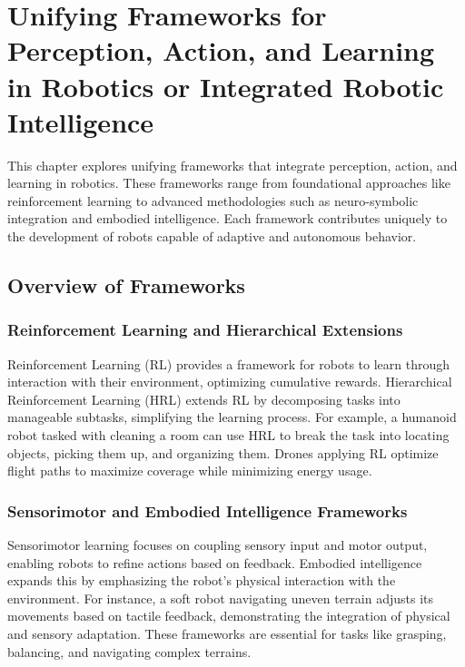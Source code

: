 \chapter{Unifying Frameworks for Perception, Action, and Learning in Robotics or Integrated Robotic Intelligence}
This chapter explores unifying frameworks that integrate perception, action, and learning in robotics. These frameworks range from foundational approaches like reinforcement learning to advanced methodologies such as neuro-symbolic integration and embodied intelligence. Each framework contributes uniquely to the development of robots capable of adaptive and autonomous behavior.

\section{Overview of Frameworks}
    \subsection{Reinforcement Learning and Hierarchical Extensions}
    Reinforcement Learning (RL) provides a framework for robots to learn through interaction with their environment, optimizing cumulative rewards. Hierarchical Reinforcement Learning (HRL) extends RL by decomposing tasks into manageable subtasks, simplifying the learning process. For example, a humanoid robot tasked with cleaning a room can use HRL to break the task into locating objects, picking them up, and organizing them. Drones applying RL optimize flight paths to maximize coverage while minimizing energy usage. \cite{sutton-2018-reinforcement-learning} \cite{barto-2003-hierarchical}
    
    \subsection{Sensorimotor and Embodied Intelligence Frameworks}
    Sensorimotor learning focuses on coupling sensory input and motor output, enabling robots to refine actions based on feedback. Embodied intelligence expands this by emphasizing the robot's physical interaction with the environment. For instance, a soft robot navigating uneven terrain adjusts its movements based on tactile feedback, demonstrating the integration of physical and sensory adaptation. These frameworks are essential for tasks like grasping, balancing, and navigating complex terrains. \cite{argall-2009-imitation-learning} \cite{pfeifer-2007-embodied-intelligence}


